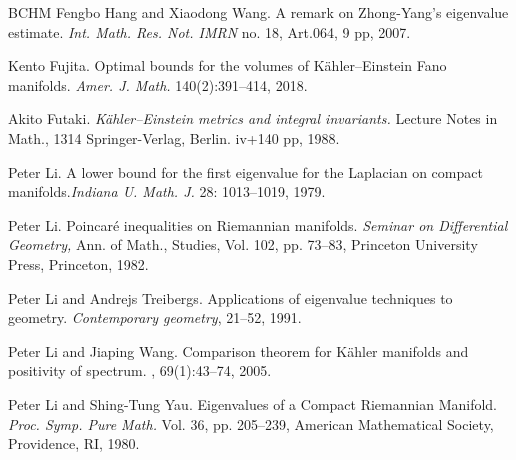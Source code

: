\documentclass[12pt, reqno]{amsart}
\theoremstyle{plain}
\theoremstyle{definition}
\renewcommand{\>}{\rightarrow}
\renewcommand{\#}{\sharp}
\numberwithin{equation}{section} %
\begin{document}
\begin{thebibliography}{BCHM}
 Fengbo Hang and Xiaodong Wang.
A remark on Zhong-Yang's eigenvalue estimate.
\emph{Int. Math. Res. Not. IMRN}  no. 18, Art.064, 9 pp, 2007.



 Kento Fujita. Optimal bounds for the volumes of K\"ahler--Einstein Fano manifolds. \emph{Amer. J. Math.} 140(2):391--414, 2018.

 Akito Futaki. \emph{K\"ahler--Einstein metrics and integral invariants.} {Lecture Notes in Math., 1314 Springer-Verlag, Berlin.} iv+140 pp, 1988.



Peter Li.  A lower bound for the first eigenvalue for the Laplacian on compact manifolds.\emph{Indiana U. Math. J.} 28: 1013--1019, 1979.

 Peter Li.  Poincar\'e inequalities on Riemannian manifolds. \emph{ Seminar on Differential Geometry, } Ann. of Math., Studies, Vol. 102, pp. 73--83, Princeton University Press, Princeton, 1982.
 

Peter  Li and Andrejs Treibergs.
Applications of eigenvalue techniques to geometry. \emph{Contemporary geometry}, 21--52, 1991.


Peter Li and Jiaping Wang.
\newblock Comparison theorem for {K}\"ahler manifolds and positivity of spectrum.
, 69(1):43--74,  2005.

Peter  Li and Shing-Tung Yau.  Eigenvalues of a Compact Riemannian Manifold. \emph{Proc. Symp. Pure Math.} Vol. 36, pp. 205--239, American Mathematical Society, Providence, RI, 1980.








  


\end{thebibliography}
\end{document}
